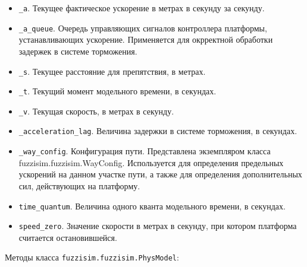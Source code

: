 \begin{itemize}
	\item  \lstinline!_a!. Текущее фактическое ускорение в метрах в секунду за секунду.
	\item  \lstinline!_a_queue!. Очередь управляющих сигналов контроллера платформы, устанавливающих ускорение. Применяется для окрректной обработки задержек в системе торможения.
	\item  \lstinline!_s!. Текущее расстояние для препятствия, в метрах.
	\item  \lstinline!_t!. Текущий момент модельного времени, в секундах.
	\item  \lstinline!_v!. Текущая скорость, в метрах в секунду.
	\item  \lstinline!_acceleration_lag!. Величина задержки в системе торможения, в секундах.
	\item  \lstinline!_way_config!. Конфигурация пути. Представлена экземпляром класса fuzzisim.fuzzisim.WayConfig. Используется для определения предельных ускорений на данном участке пути, а также для определения дополнительных сил, действующих на платформу.
	\item  \lstinline!time_quantum!. Величина одного кванта модельного времени, в секундах.
	\item  \lstinline!speed_zero!. Значение скорости в метрах в секунду, при котором платформа считается остановившейся.
\end{itemize}
Методы класса \lstinline!fuzzisim.fuzzisim.PhysModel!:

